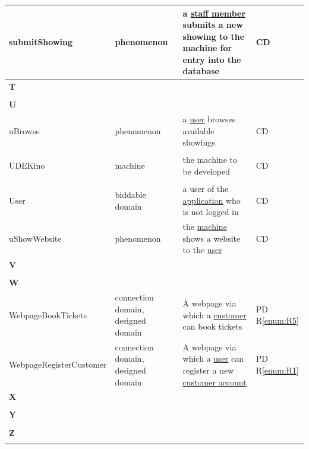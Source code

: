 \documentclass[a4paper,10pt,titlepage,bibtotoc,bibtotocnumbered]{scrreprt}
\begin{document}
\begin{longtable}{|l|p{3cm}|p{5cm}|l|}
\hline
\hypertarget{glossary:submitShowing}{submitShowing} & phenomenon & a \hyperlink{glossary:StaffMember}{staff member} submits a new showing to the machine for entry into the database & CD\\
\hline
\multicolumn{4}{|l|}{\textbf{T}}\\
\hline
&  &  & \\
\hline
\multicolumn{4}{|l|}{\textbf{U}}\\
\hline
\hypertarget{glossary:uBrowse}{uBrowse} & phenomenon & a \hyperlink{glossary:User}{user} browses available showings & CD\\
\hline
\hypertarget{glossary:UDEKino}{UDEKino} & machine & the machine to be developed & CD\\
\hline
\hypertarget{glossary:User}{User} & biddable domain & a user of the \hyperlink{glossary:UDEKino}{application} who is not logged in & CD\\
\hline
\hypertarget{glossary:uShowWebsite}{uShowWebsite} & phenomenon & the \hyperlink{glossary:UDEKino}{machine} shows a website to the \hyperlink{glossary:User}{user} & CD\\
\hline
\multicolumn{4}{|l|}{\textbf{V}}\\
\hline
&  &  & \\
\hline
\multicolumn{4}{|l|}{\textbf{W}}\\
\hline
\hypertarget{glossary:WebpageBookTickets}{WebpageBookTickets} & connection domain, designed domain & A webpage via which a \hyperlink{glossary:Customer}{customer} can book tickets & PD R\ref{enum:R5}\\
\hline
\hypertarget{glossary:WebpageRegisterCustomer}{WebpageRegisterCustomer} & connection domain, designed domain & A webpage via which a \hyperlink{glossary:User}{user} can register a new \hyperlink{glossary:Customer}{customer account} & PD R\ref{enum:R1}\\
\hline
\multicolumn{4}{|l|}{\textbf{X}}\\
\hline
&  &  & \\
\hline
\multicolumn{4}{|l|}{\textbf{Y}}\\
\hline
&  &  & \\
\hline
\multicolumn{4}{|l|}{\textbf{Z}}\\
\hline
&  &  & \\
\hline
\end{longtable}
\end{document}
